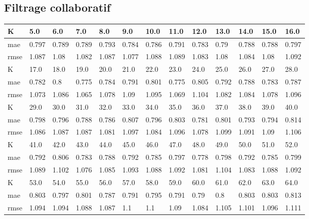 \begin{appendices}
\subsection*{Filtrage collaboratif}
\begin{center} 
	\begin{tabularx}{\textwidth}{|l|X|X|X|X|X|X|X|X|X|X|X|X|} 
		\hline 
		K & 5.0 & 6.0 & 7.0 & 8.0 & 9.0 & 10.0 & 11.0 & 12.0 & 13.0 & 14.0 & 15.0 & 16.0 \\ \hline 
		mae & 0.797 & 0.789 & 0.789 & 0.793 & 0.784 & 0.786 & 0.791 & 0.783 & 0.79 & 0.788 & 0.788 & 0.797 \\ \hline 
		rmse & 1.087 & 1.08 & 1.082 & 1.087 & 1.077 & 1.088 & 1.089 & 1.083 & 1.08 & 1.084 & 1.08 & 1.092 \\ \hline 
		\hline 
		K & 17.0 & 18.0 & 19.0 & 20.0 & 21.0 & 22.0 & 23.0 & 24.0 & 25.0 & 26.0 & 27.0 & 28.0 \\ \hline 
		mae & 0.782 & 0.8 & 0.775 & 0.784 & 0.791 & 0.801 & 0.775 & 0.805 & 0.792 & 0.788 & 0.783 & 0.787 \\ \hline 
		rmse & 1.073 & 1.086 & 1.065 & 1.078 & 1.09 & 1.095 & 1.069 & 1.104 & 1.082 & 1.084 & 1.078 & 1.096 \\ \hline 
		\hline 
		K & 29.0 & 30.0 & 31.0 & 32.0 & 33.0 & 34.0 & 35.0 & 36.0 & 37.0 & 38.0 & 39.0 & 40.0 \\ \hline 
		mae & 0.798 & 0.796 & 0.788 & 0.786 & 0.807 & 0.796 & 0.803 & 0.781 & 0.801 & 0.793 & 0.794 & 0.814 \\ \hline 
		rmse & 1.086 & 1.087 & 1.087 & 1.081 & 1.097 & 1.084 & 1.096 & 1.078 & 1.099 & 1.091 & 1.09 & 1.106 \\ \hline 
		\hline 
		K & 41.0 & 42.0 & 43.0 & 44.0 & 45.0 & 46.0 & 47.0 & 48.0 & 49.0 & 50.0 & 51.0 & 52.0 \\ \hline 
		mae & 0.792 & 0.806 & 0.783 & 0.788 & 0.792 & 0.785 & 0.797 & 0.778 & 0.798 & 0.792 & 0.785 & 0.799 \\ \hline 
		rmse & 1.089 & 1.102 & 1.076 & 1.085 & 1.093 & 1.088 & 1.092 & 1.081 & 1.104 & 1.083 & 1.088 & 1.092 \\ \hline 
		\hline 
		K & 53.0 & 54.0 & 55.0 & 56.0 & 57.0 & 58.0 & 59.0 & 60.0 & 61.0 & 62.0 & 63.0 & 64.0 \\ \hline 
		mae & 0.803 & 0.797 & 0.801 & 0.787 & 0.791 & 0.795 & 0.791 & 0.79 & 0.8 & 0.803 & 0.803 & 0.813 \\ \hline 
		rmse & 1.094 & 1.094 & 1.088 & 1.087 & 1.1 & 1.1 & 1.09 & 1.084 & 1.105 & 1.101 & 1.096 & 1.111 \\ \hline 

\end{tabularx}
\end{center}
\end{appendices}
